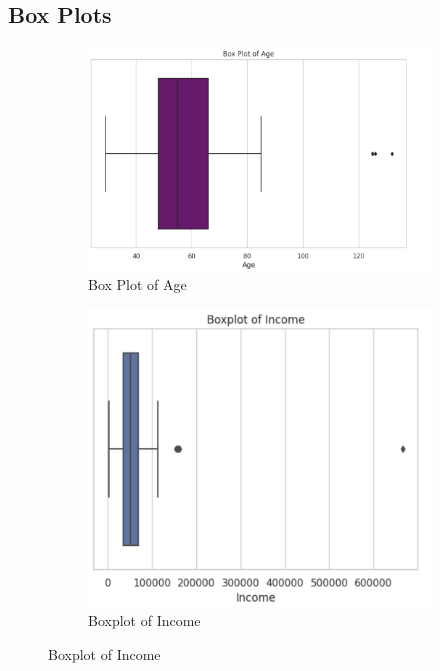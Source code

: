 \documentclass[a4paper]{article}
\begin{document}
\subsection{Box Plots}
\begin{figure}[h]
    \centering
    \begin{subfigure}{0.3\textwidth}
        \includegraphics[width=\linewidth]{Box Plot of Age.png}
        \caption{Box Plot of Age}
        \label{fig:sub1}
    \end{subfigure}
    \hfill
    \begin{subfigure}{0.3\textwidth}
        \includegraphics[width=\linewidth]{Boxplot of Income.png}
        \caption{Boxplot of Income}
        \label{fig:sub2}

\end{subfigure}
\end{figure}
\end{document}
